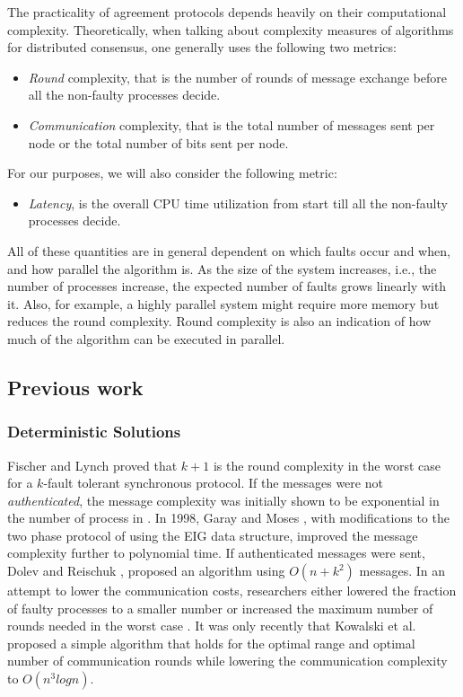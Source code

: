 The practicality of agreement protocols depends heavily on their computational complexity. Theoretically, when talking about complexity measures of algorithms for distributed consensus, one generally uses the following two metrics:
\begin{itemize}
\item \textit{Round} complexity, that is the number of rounds of message exchange before all the non-faulty processes decide.
\item \textit{Communication} complexity, that is the total number of messages sent per node or the total number of bits sent per node.
\end{itemize}
For our purposes, we will also consider the following metric: 
\begin{itemize}
\item \textit{Latency}, is the overall CPU time utilization from start till all the non-faulty processes decide.
\end{itemize}
All of these quantities are in general dependent on which faults occur and when, and how parallel the algorithm is. As the size of the system increases, i.e., the number of processes increase, the expected number of faults grows linearly with it. Also, for example, a highly parallel system might require more memory but reduces the round complexity. Round complexity is also an indication of how much of the algorithm can be executed in parallel.

\subsection{Previous work}

\subsubsection{Deterministic Solutions}
Fischer and Lynch \cite{Fischer81alower} proved that $k + 1$ is the round complexity in the worst case for a $k$-fault tolerant synchronous protocol. If the messages were not \textit{authenticated}, the message complexity was initially shown to be exponential in the number of process in \cite{PeaseSL80}. In 1998, Garay and Moses \cite{GarayM98}, with modifications to the two phase protocol of \cite{BDDS87} using the EIG data structure, improved the message complexity further to polynomial time. If authenticated messages were sent, Dolev and Reischuk \cite{DolevR85}, proposed an algorithm using $O(n + k^2)$ messages. In an attempt to lower the communication costs, researchers either lowered the fraction of faulty processes to a smaller number \cite{DRS90} or increased the maximum number of rounds needed in the worst case \cite{TPS87}. It was only recently that Kowalski et al. \cite{KM13} proposed a simple algorithm that holds for the optimal range and optimal number of communication rounds while lowering the communication complexity to $O(n^{3}logn)$.

